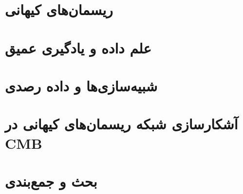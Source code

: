 \documentclass[a4paper,titlepage,12pt,fleqn,oneside]{report}
\begin{document}
\newpage
\setcounter{footnote}{0}
\chapter{ریسمان‌های کیهانی}
\label{ch:cosmic_string}


\newpage
\setcounter{footnote}{0}
\chapter{علم داده و یادگیری عمیق}
\label{ch:deep_learning}


\protect\footnotemark
\newpage
\setcounter{footnote}{0}
\chapter{ شبیه‌سازی‌ها و داده رصدی}
\label{ch:simulations}


\newpage
\setcounter{footnote}{0}
\chapter{آشکارسازی شبکه ریسمان‌های کیهانی در CMB}
\label{ch:detection_pipeline}


\newpage
\setcounter{footnote}{0}
\chapter{بحث و جمع‌بندی}
\label{ch:conclusion}


%	
%	
%	
%	
%	
%	
	
\end{document}

